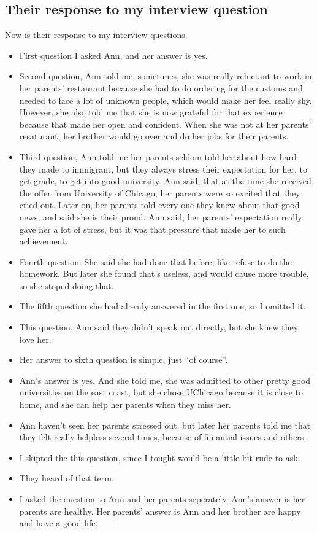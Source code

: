 \subsection{Their response to my interview question}
Now is their response to my interview questions.
\begin{itemize}
  \item First question I asked Ann, and her answer is yes.
  \item Second question, Ann told me, sometimes, she was really reluctant to
  work in her parents' restaurant because she had to do ordering for the
  customs and needed to face a lot of unknown people, which would make her feel
  really shy. However, she also told me that she is now grateful for that 
  experience because that made her open and confident. When she was not at her
  parents' resaturant, her brother would go over and do her jobs for their
  parents.
  \item Third question, Ann told me her parents seldom told her about how hard
  they made to immigrant, but they always stress their expectation for her, to
  get grade, to get into good university. Ann said, that at the time she
  received the offer from University of Chicago, her parents were so excited
  that they cried out. Later on, her parents told every one they knew about that
  good news, and said she is their prond. Ann said, her parents' expectation
  really gave her a lot of stress, but it was that pressure that made her to
  such achievement.
  \item Fourth question: She said she had done that before, like refuse to do
  the homework. But later she found that's useless, and would cause more
  trouble, so she stoped doing that.
  \item The fifth question she had already answered in the first one, so I
  omitted it.
  \item This question, Ann said they didn't speak out directly, but she knew
  they love her.
  \item Her answer to sixth question is simple, just ``of course''.
  \item Ann's answer is yes. And she told me, she was admitted to other pretty
  good universities on the east coast, but she chose UChicago because it is
  close to home, and she can help her parents when they miss her.
  \item Ann haven't seen her parents stressed out, but later her parents told me
  that they felt really helpless several times, because of finiantial issues and
  others.
  \item I skipted the this question, since I tought would be a little bit rude
  to ask.
  \item They heard of that term.
  \item I asked the question to Ann and her parents seperately. Ann's answer is
  her parents are healthy. Her parents' answer is Ann and her brother
  are happy and have a good life.
\end{itemize}